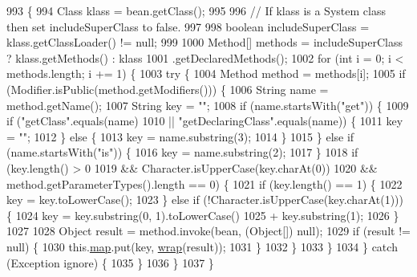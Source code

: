 \begin{DoxyCode}
993                                           \{
994         Class klass = bean.getClass();
995 
996 \textcolor{comment}{// If klass is a System class then set includeSuperClass to false.}
997 
998         \textcolor{keywordtype}{boolean} includeSuperClass = klass.getClassLoader() != null;
999 
1000         Method[] methods = includeSuperClass ? klass.getMethods() : klass
1001                 .getDeclaredMethods();
1002         \textcolor{keywordflow}{for} (\textcolor{keywordtype}{int} i = 0; i < methods.length; i += 1) \{
1003             \textcolor{keywordflow}{try} \{
1004                 Method method = methods[i];
1005                 \textcolor{keywordflow}{if} (Modifier.isPublic(method.getModifiers())) \{
1006                     String name = method.getName();
1007                     String key = \textcolor{stringliteral}{""};
1008                     \textcolor{keywordflow}{if} (name.startsWith(\textcolor{stringliteral}{"get"})) \{
1009                         \textcolor{keywordflow}{if} (\textcolor{stringliteral}{"getClass"}.equals(name)
1010                                 || \textcolor{stringliteral}{"getDeclaringClass"}.equals(name)) \{
1011                             key = \textcolor{stringliteral}{""};
1012                         \} \textcolor{keywordflow}{else} \{
1013                             key = name.substring(3);
1014                         \}
1015                     \} \textcolor{keywordflow}{else} \textcolor{keywordflow}{if} (name.startsWith(\textcolor{stringliteral}{"is"})) \{
1016                         key = name.substring(2);
1017                     \}
1018                     \textcolor{keywordflow}{if} (key.length() > 0
1019                             && Character.isUpperCase(key.charAt(0))
1020                             && method.getParameterTypes().length == 0) \{
1021                         \textcolor{keywordflow}{if} (key.length() == 1) \{
1022                             key = key.toLowerCase();
1023                         \} \textcolor{keywordflow}{else} \textcolor{keywordflow}{if} (!Character.isUpperCase(key.charAt(1))) \{
1024                             key = key.substring(0, 1).toLowerCase()
1025                                     + key.substring(1);
1026                         \}
1027 
1028                         Object result = method.invoke(bean, (Object[]) null);
1029                         \textcolor{keywordflow}{if} (result != null) \{
1030                             this.\hyperlink{classorg_1_1json_1_1_j_s_o_n_object_a88de444c62dae3f3193d1276bb87ba31}{map}.put(key, \hyperlink{classorg_1_1json_1_1_j_s_o_n_object_a5aa793d5ebe4bb6002bd37d84d65742e}{wrap}(result));
1031                         \}
1032                     \}
1033                 \}
1034             \} \textcolor{keywordflow}{catch} (Exception ignore) \{
1035             \}
1036         \}
1037     \}
\end{DoxyCode}
